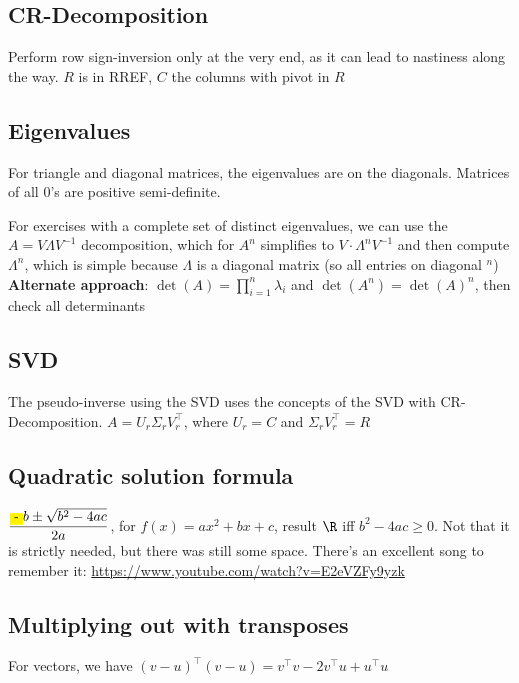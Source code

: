 \vspace{-0.5pc}
\subsection{CR-Decomposition}
Perform row sign-inversion only at the very end, as it can lead to nastiness along the way. $R$ is in RREF, $C$ the columns with pivot in $R$


\vspace{-0.5pc}
\subsection{Eigenvalues}
For triangle and diagonal matrices, the eigenvalues are on the diagonals. Matrices of all $0$'s are positive semi-definite.

For exercises with a complete set of distinct eigenvalues, we can use the $A = V\Lambda V^{-1}$ decomposition, which for $A^n$ simplifies to $V\cdot \Lambda^n V^{-1}$ and then compute $\Lambda^n$, which is simple because $\Lambda$ is a diagonal matrix (so all entries on diagonal $^n$)
\textbf{Alternate approach}: $\det(A) = \prod_{i = 1}^{n} \lambda_i$ and $\det(A^n) = \det(A)^n$, then check all determinants


\vspace{-0.5pc}
\subsection{SVD}
The pseudo-inverse using the SVD uses the concepts of the SVD with CR-Decomposition. $A = U_r \Sigma_r V_r^{\top}$, where $U_r = C$ and $\Sigma_r V_r^{\top} = R$


\vspace{-0.5pc}
\subsection{Quadratic solution formula}
$\displaystyle \frac{\colorbox{yellow}{-}b \pm \sqrt{b^2 - 4ac}}{2a}$, for $f(x) = ax^2 + bx + c$, result $\R$ iff $b^2 - 4ac \geq 0$. Not that it is strictly needed, but there was still some space. There's an excellent song to remember it: \url{https://www.youtube.com/watch?v=E2eVZFy9yzk}



\vspace{-0.5pc}
\subsection{Multiplying out with transposes}
For vectors, we have $(v - u)^{\top}(v - u) = v^{\top} v - 2v^{\top}u + u^{\top}u$

